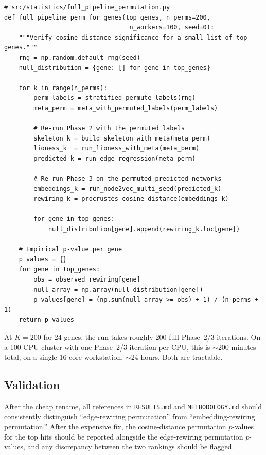 \documentclass[11pt]{article}
\newcommand{\code}[1]{\texttt{#1}}
\begin{document}
\begin{lstlisting}[style=pythonstyle,caption={Sketch: full-pipeline permutation for top-hit verification.}]
# src/statistics/full_pipeline_permutation.py
def full_pipeline_perm_for_genes(top_genes, n_perms=200,
                                  n_workers=100, seed=0):
    """Verify cosine-distance significance for a small list of top genes."""
    rng = np.random.default_rng(seed)
    null_distribution = {gene: [] for gene in top_genes}

    for k in range(n_perms):
        perm_labels = stratified_permute_labels(rng)
        meta_perm = meta_with_permuted_labels(perm_labels)

        # Re-run Phase 2 with the permuted labels
        skeleton_k = build_skeleton_with_meta(meta_perm)
        lioness_k  = run_lioness_with_meta(meta_perm)
        predicted_k = run_edge_regression(meta_perm)

        # Re-run Phase 3 on the permuted predicted networks
        embeddings_k = run_node2vec_multi_seed(predicted_k)
        rewiring_k = procrustes_cosine_distance(embeddings_k)

        for gene in top_genes:
            null_distribution[gene].append(rewiring_k.loc[gene])

    # Empirical p-value per gene
    p_values = {}
    for gene in top_genes:
        obs = observed_rewiring[gene]
        null_array = np.array(null_distribution[gene])
        p_values[gene] = (np.sum(null_array >= obs) + 1) / (n_perms + 1)
    return p_values
\end{lstlisting}

\noindent At $K=200$ for 24 genes, the run takes roughly 200 full Phase~2/3 iterations. On a 100-CPU cluster with one Phase~2/3 iteration per CPU, this is $\sim$200 minutes total; on a single 16-core workstation, $\sim$24 hours. Both are tractable.

\subsection{Validation}

After the cheap rename, all references in \code{RESULTS.md} and \code{METHODOLOGY.md} should consistently distinguish ``edge-rewiring permutation'' from ``embedding-rewiring permutation.'' After the expensive fix, the cosine-distance permutation $p$-values for the top hits should be reported alongside the edge-rewiring permutation $p$-values, and any discrepancy between the two rankings should be flagged.
\end{document}

